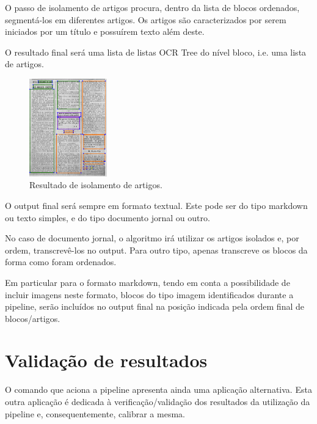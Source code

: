 

O passo de isolamento de artigos procura, dentro da lista de blocos ordenados, segmentá-los em diferentes artigos. Os artigos são caracterizados por serem iniciados por um título e possuírem texto além deste.

O resultado final será uma lista de listas OCR Tree do nível bloco, i.e. uma lista de artigos.

\begin{figure}[H]
	\centering
	\includegraphics[width=0.3\textwidth]{images/ilustracoes/pipeline_isolate_articles_example.png}
	\caption{Resultado de isolamento de artigos.}
	\label{fig:pipeline_isolate_articles_example}
\end{figure}




O output final será sempre em formato textual. Este pode ser do tipo markdown ou texto simples, e do tipo documento jornal ou outro. 

No caso de documento jornal, o algoritmo irá utilizar os artigos isolados e, por ordem, transcrevê-los no output. Para outro tipo, apenas transcreve os blocos da forma como foram ordenados.

Em particular para o formato markdown, tendo em conta a possibilidade de incluir imagens neste formato, blocos do tipo imagem identificados durante a pipeline, serão incluídos no output final na posição indicada pela ordem final de blocos/artigos.



\section{Validação de resultados}

O comando que aciona a pipeline apresenta ainda uma aplicação alternativa. Esta outra aplicação é dedicada à verificação/validação dos resultados da utilização da pipeline e, consequentemente, calibrar a mesma.

